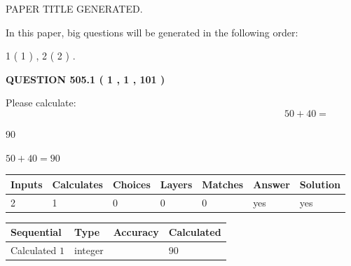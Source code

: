 \documentclass[12pt]{article}
\begin{document}
   
 PAPER TITLE GENERATED.
   
   
   
\vspace{0.2in}
   
In this paper, big questions will be generated in the following order: 
   
   
   1 ( 1 )
 ,
   2 ( 2 )
 .
  
\vspace{0.2in}
  
{\textbf{\Large{QUESTION
505.1 
 ( 1 , 1 , 101 )
}}}
  
  
 
Please calculate:
\begin{equation}
50 +  %
40 = \nonumber
\end{equation}
 
 
 
\noindent{}
 
 

90
 
 
\noindent{}
 
 

 
 
 
\noindent{}
 
 

$ %
50 +  %
40=   %
90$
 
 
\noindent{}
 
 

 
   
   
   
   
\noindent\begin{tabular}{|l|l|l|l|l|l|l|}
 \hline
Inputs & Calculates & Choices & Layers & Matches & Answer & Solution \\ \hline
 2  & 
 1  & 
 0
  & 
 0  & 
 0  & 
  yes & 
  yes 
  \\ \hline
 \end{tabular}
   
   
   
   
\noindent{}
   
   
  
  
\noindent\begin{tabular}{|l|l|l|l|}
\hline
 Sequential & Type & Accuracy & Calculated \\ 
\hline
 
 
  Calculated $  1 $ & integer &  & 
  $ 90 $ 
 \\  \hline  
 \end{tabular}
   
\end{document}
